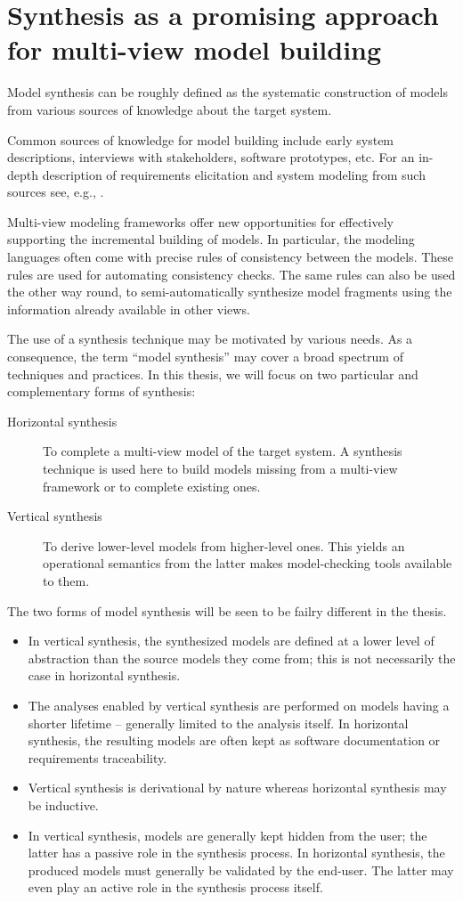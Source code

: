 \section{Synthesis as a promising approach for multi-view model building\label{section:intro-synthesis}}

Model synthesis can be roughly defined as the systematic construction of models from various sources of knowledge about the target system. 

Common sources of knowledge for model building include early system descriptions, interviews with stakeholders, software prototypes, etc. For an in-depth description of requirements elicitation and system modeling from such sources see, e.g., \cite{VanLamsweerde:2009}.

Multi-view modeling frameworks offer new opportunities for effectively supporting the incremental building of models. In particular, the modeling languages often come with precise rules of consistency between the models. These rules are used for automating consistency checks. The same rules can also be used the other way round, to semi-automatically synthesize model fragments using the information already available in other views.

The use of a synthesis technique may be motivated by various needs. As a consequence, the term ``model synthesis'' may cover a broad spectrum of techniques and practices. In this thesis, we will focus on two particular and complementary forms of synthesis:
\begin{description}
\item[Horizontal synthesis] To complete a multi-view model of the target system. A synthesis technique is used here to build models missing from a multi-view framework or to complete existing ones.
\item[Vertical synthesis] To derive lower-level models from higher-level ones. This yields an operational semantics from the latter makes model-checking tools available to them.
\end{description}

The two forms of model synthesis will be seen to be failry different in the thesis.
\begin{itemize}
\item In vertical synthesis, the synthesized models are defined at a lower level of abstraction than the source models they come from; this is not necessarily the case in horizontal synthesis.
\item The analyses enabled by vertical synthesis are performed on models having a shorter lifetime -- generally limited to the analysis itself. In horizontal synthesis, the resulting models are often kept as software documentation or requirements traceability. 
\item Vertical synthesis is derivational by nature whereas horizontal synthesis may be inductive.
\item In vertical synthesis, models are generally kept hidden from the user; the latter has a passive role in the synthesis process. In horizontal synthesis, the produced models must generally be validated by the end-user. The latter may even play an active role in the synthesis process itself.
\end{itemize}

